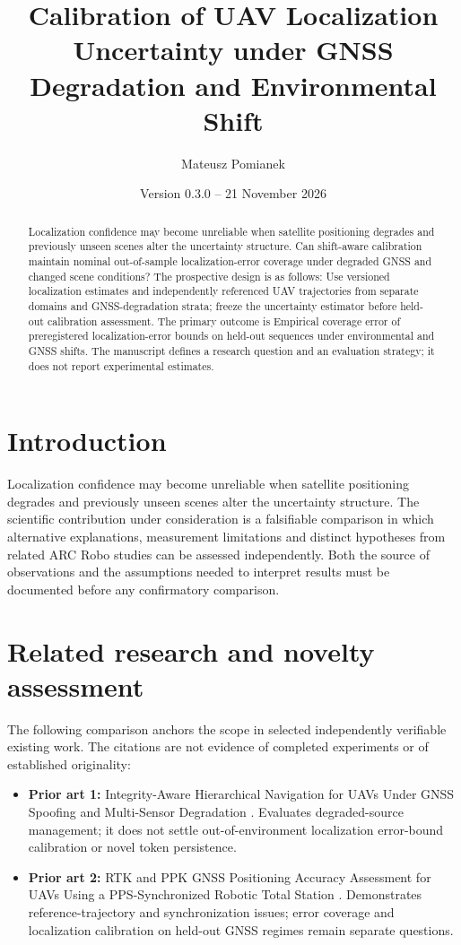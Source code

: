 \documentclass[11pt,a4paper]{article}
\title{Calibration of UAV Localization Uncertainty under GNSS Degradation and Environmental Shift}
\author{Mateusz Pomianek}
\date{Version 0.3.0 -- 21 November 2026}
\begin{document}
\maketitle

\begin{abstract}
Localization confidence may become unreliable when satellite positioning degrades and previously unseen scenes alter the uncertainty structure. Can shift-aware calibration maintain nominal out-of-sample localization-error coverage under degraded GNSS and changed scene conditions? The prospective design is as follows: Use versioned localization estimates and independently referenced UAV trajectories from separate domains and GNSS-degradation strata; freeze the uncertainty estimator before held-out calibration assessment. The primary outcome is Empirical coverage error of preregistered localization-error bounds on held-out sequences under environmental and GNSS shifts. The manuscript defines a research question and an evaluation strategy; it does not report experimental estimates.
\end{abstract}

\section{Introduction}
Localization confidence may become unreliable when satellite positioning degrades and previously unseen scenes alter the uncertainty structure. The scientific contribution under consideration is a falsifiable comparison in which alternative explanations, measurement limitations and distinct hypotheses from related ARC Robo studies can be assessed independently. Both the source of observations and the assumptions needed to interpret results must be documented before any confirmatory comparison.

\section{Related research and novelty assessment}
The following comparison anchors the scope in selected independently verifiable existing work. The citations are not evidence of completed experiments or of established originality:
\begin{itemize}
\item \textbf{Prior art 1:} Integrity-Aware Hierarchical Navigation for UAVs Under GNSS Spoofing and Multi-Sensor Degradation \cite{source1}. Evaluates degraded-source management; it does not settle out-of-environment localization error-bound calibration or novel token persistence.
\item \textbf{Prior art 2:} RTK and PPK GNSS Positioning Accuracy Assessment for UAVs Using a PPS-Synchronized Robotic Total Station \cite{source2}. Demonstrates reference-trajectory and synchronization issues; error coverage and localization calibration on held-out GNSS regimes remain separate questions.
\end{itemize}
\end{document}
